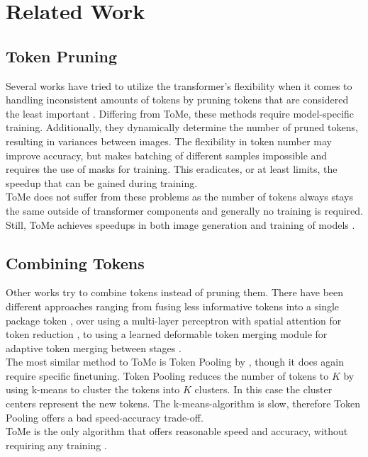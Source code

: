 \section{Related Work} \label{related_work}


\subsection{Token Pruning}
Several works have tried to utilize the transformer's flexibility when it comes to handling inconsistent amounts of tokens by pruning tokens that are considered the least important \cite{meng2022adavit,yin2022vit}. 
Differing from ToMe, these methods require model-specific training. Additionally, they dynamically determine the number of pruned tokens, resulting in variances between images. The flexibility in token number may improve accuracy, but makes batching of different samples impossible and requires the use of masks for training. This eradicates, or at least limits, the speedup that can be gained during training.\\
ToMe does not suffer from these problems as the number of tokens always stays the same outside of transformer components and generally no training is required. Still, ToMe achieves speedups in both image generation and training of models \cite{bolya2023tomesd}.



\subsection{Combining Tokens}
Other works try to combine tokens instead of pruning them.
There have been different approaches ranging from fusing less informative tokens into a single package token \cite{kong2021spvit, liang2022not}, over using a multi-layer perceptron with spatial attention for token reduction \cite{ryoo2021tokenlearner}, to using a learned deformable token merging module for adaptive token merging between stages \cite{pan2022less}.\\
The most similar method to ToMe is Token Pooling by \cite{marin2021token}, though it does again require specific finetuning. Token Pooling reduces the number of tokens to \(K\) by using k-means to cluster the tokens into \(K\) clusters. In this case the cluster centers represent the new tokens. The k-means-algorithm is slow, therefore Token Pooling offers a bad speed-accuracy trade-off.\\
ToMe is the only algorithm that offers reasonable speed and accuracy, without requiring any training \cite{bolya2023tome}.



